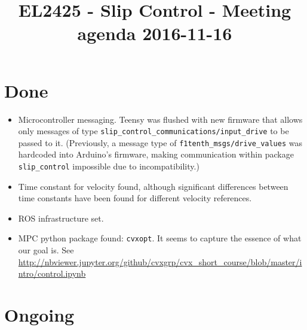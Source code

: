 \documentclass[oneside,12pt]{article}
\title{EL2425 - Slip Control - Meeting agenda 2016-11-16}
\begin{document}
\maketitle

\section{Done}

\begin{itemize}
  \item Microcontroller messaging. Teensy was flushed with new firmware that
    allows only messages of type \texttt{slip\_control\_communications/input\_drive}
    to be passed to it. (Previously, a message type of \texttt{f1tenth\_msgs/drive\_values}
    was hardcoded into Arduino's firmware, making communication within package
    \texttt{slip\_control} impossible due to incompatibility.)
  \item Time constant for velocity found, although significant differences
    between time constants have been found for different velocity references.
  \item ROS infrastructure set.
  \item MPC python package found: \texttt{cvxopt}. It seems to capture the
    essence of what our goal is. See \url{http://nbviewer.jupyter.org/github/cvxgrp/cvx_short_course/blob/master/intro/control.ipynb}
\end{itemize}



\section{Ongoing}
\end{document}
